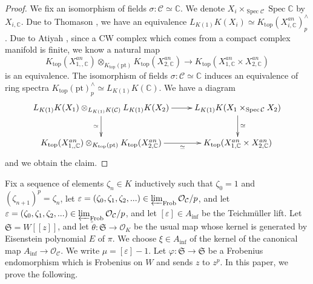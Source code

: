 \documentclass[11pt]{amsart}
\newcommand{\bC}{\mathbb{C}}
\newcommand{\sC}{\mathcal{C}}
\newcommand{\sO}{\mathcal{O}}
\newcommand{\LK}{{L_{K(1)}}}
\newcommand{\Spec}{\operatorname{Spec}}
\renewcommand{\lim}{\operatornamewithlimits{\varprojlim}}
\renewcommand{\epsilon}{\varepsilon}
\newcommand{\Ainf}{A_{\operatorname{inf}}}
\newcommand{\Cu}{\mathcal{C}}
\newcommand{\mS}{\mathfrak{S}}
\newcounter{spec}
\theoremstyle{definition}
\theoremstyle{remark}
\numberwithin{equation}{section}
\begin{document}
\begin{proof}
We fix an isomorphism of fields $\sigma:\sC \simeq \bC$. We denote $X_{i}\times_{\Spec \sC} \Spec \bC$ by $X_{i,\bC}$. Due to Thomason \cite{Thomason}, we have an equivalence $L_{K(1)}K(X_i)\simeq K_{\text{top}}(X_{i,\bC}^{an})^{\wedge}_p$. Due to Atiyah \cite{Atiyah}, since a CW complex which comes from a compact complex manifold is finite, we know a natural map
\[
K_{\text{top}}(X_{1,,\bC}^{an}) \otimes_{K_{\text{top}}(\text{pt})} K_{\text{top}}(X_{2,\bC}^{an}) \to K_{\text{top}}(X_{1,\bC}^{an}\times X_{2,\bC}^{an})
\]
is an equivalence. The isomorphism of fields $\sigma:\sC \simeq \bC$ induces an equivalence of ring spectra $K_{\text{top}}(\text{pt})^{\wedge}_p \simeq \LK K(\bC)$. We have a diagram
\[
\xymatrix{
L_{K(1)}K(X_1) \otimes_{L_{K(1)}K(\sC)} L_{K(1)}K(X_2) \ar[d]_-{\simeq} \ar[r]&L_{K(1)}K(X_1\times_{\Spec \sC} X_2)\ar[d]^{\simeq}\\
K_{\text{top}}(X_{1,,\bC}^{an}) \otimes_{K_{\text{top}}(\text{pt})} K_{\text{top}}(X_{2,\bC}^{an})\ar[r]_-{\simeq}&K_{\text{top}}(X_{1,\bC}^{an}\times X_{2,\bC}^{an})
}
\]
and we obtain the claim.
\end{proof}

 Fix a sequence of elements $\zeta_n\in K$ inductively such that $\zeta_0=1$ and $(\zeta_{n+1})^p=\zeta_n$, let $\epsilon=(\zeta_0,\zeta_1,\zeta_2,...)\in \lim_{\text{Frob}}\sO_\Cu/p$, and let $\epsilon=(\zeta_0,\zeta_1,\zeta_2,...)\in \lim_{\text{Frob}}\sO_\Cu/p$, and let $[\epsilon]\in \Ainf$ be the Teichm\"uller lift. Let $\mS=W[[z]]$, and let $\tilde{\theta}:\mS \to \sO_K$ be the usual map whose kernel is generated by Eisenstein polynomial $E$ of $\pi$. We choose $\xi \in \Ainf$ of the kernel of the canonical map $\Ainf\to \sO_\sC$. We write $\mu=[\epsilon]-1$. Let $\varphi:\mS \to \mS$ be a Frobenius endomorphism which is Frobenius on $W$ and sends $z$ to $z^p$. In this paper, we prove the following.
\end{document}
